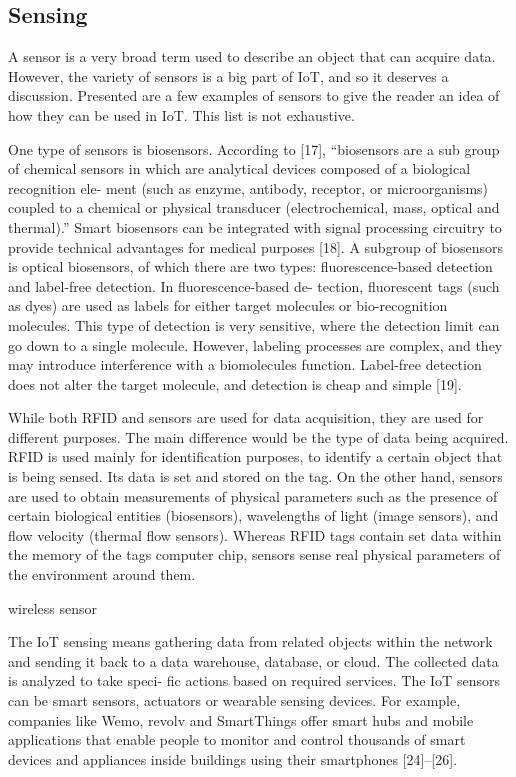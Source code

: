 \subsection{Sensing}

A sensor is a very broad term used to describe an object
that can acquire data. However, the variety of sensors is a big
part of IoT, and so it deserves a discussion. Presented are a
few examples of sensors to give the reader an idea of how they
can be used in IoT. This list is not exhaustive.

One type of sensors is biosensors. According to [17],
“biosensors are a sub group of chemical sensors in which are
analytical devices composed of a biological recognition ele-
ment (such as enzyme, antibody, receptor, or microorganisms)
coupled to a chemical or physical transducer (electrochemical,
mass, optical and thermal).” Smart biosensors can be integrated
with signal processing circuitry to provide technical advantages
for medical purposes [18]. A subgroup of biosensors is optical
biosensors, of which there are two types: fluorescence-based
detection and label-free detection. In fluorescence-based de-
tection, fluorescent tags (such as dyes) are used as labels for
either target molecules or bio-recognition molecules. This type
of detection is very sensitive, where the detection limit can
go down to a single molecule. However, labeling processes
are complex, and they may introduce interference with a
biomolecules function. Label-free detection does not alter the
target molecule, and detection is cheap and simple [19].

While both RFID and sensors are used for data acquisition,
they are used for different purposes. The main difference would
be the type of data being acquired. RFID is used mainly for
identification purposes, to identify a certain object that is being
sensed. Its data is set and stored on the tag. On the other
hand, sensors are used to obtain measurements of physical
parameters such as the presence of certain biological entities
(biosensors), wavelengths of light (image sensors), and flow
velocity (thermal flow sensors). Whereas RFID tags contain
set data within the memory of the tags computer chip, sensors
sense real physical parameters of the environment around
them.

wireless sensor

The IoT sensing means gathering data from related objects
within the network and sending it back to a data warehouse,
database, or cloud. The collected data is analyzed to take speci-
fic actions based on required services. The IoT sensors can be
smart sensors, actuators or wearable sensing devices. For example,
companies like Wemo, revolv and SmartThings offer smart
hubs and mobile applications that enable people to monitor
and control thousands of smart devices and appliances inside
buildings using their smartphones [24]–[26].

